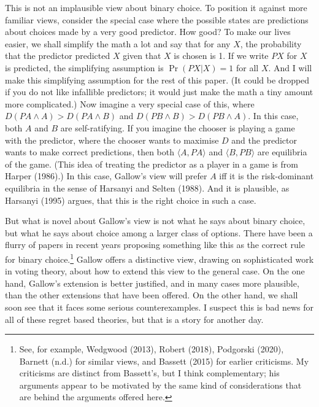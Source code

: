 \documentclass[
  12pt,
]{article}
\begin{document}
This is not an implausible view about binary choice. To position it
against more familiar views, consider the special case where the
possible states are predictions about choices made by a very good
predictor. How good? To make our lives easier, we shall simplify the
math a lot and say that for any \(X\), the probability that the
predictor predicted \(X\) given that \(X\) is chosen is 1. If we write
\(PX\) for \(X\) is predicted, the simplifying assumption is
\(\Pr(PX | X) = 1\) for all \(X\). And I will make this simplifying
assumption for the rest of this paper. (It could be dropped if you do
not like infallible predictors; it would just make the math a tiny
amount more complicated.) Now imagine a very special case of this, where
\(D(PA \wedge A) > D(PA \wedge B)\) and
\(D(PB \wedge B) > D(PB \wedge A)\). In this case, both \(A\) and \(B\)
are self-ratifying. If you imagine the chooser is playing a game with
the predictor, where the chooser wants to maximise \(D\) and the
predictor wants to make correct predictions, then both
\(\langle A, PA\rangle\) and \(\langle B, PB\rangle\) are equilibria of
the game. (This idea of treating the predictor as a player in a game is
from Harper (1986).) In this case, Gallow's view will prefer \(A\) iff
it is the risk-dominant equilibria in the sense of Harsanyi and Selten
(1988). And it is plausible, as Harsanyi (1995) argues, that this is the
right choice in such a case.

But what is novel about Gallow's view is not what he says about binary
choice, but what he says about choice among a larger class of options.
There have been a flurry of papers in recent years proposing something
like this as the correct rule for binary choice.\footnote{See, for
  example, Wedgwood (2013), Robert (2018), Podgorski (2020), Barnett
  (n.d.) for similar views, and Bassett (2015) for earlier criticisms.
  My criticisms are distinct from Bassett's, but I think complementary;
  his arguments appear to be motivated by the same kind of
  considerations that are behind the arguments offered here.} Gallow
offers a distinctive view, drawing on sophisticated work in voting
theory, about how to extend this view to the general case. On the one
hand, Gallow's extension is better justified, and in many cases more
plausible, than the other extensions that have been offered. On the
other hand, we shall soon see that it faces some serious
counterexamples. I suspect this is bad news for all of these regret
based theories, but that is a story for another day.
\end{document}
